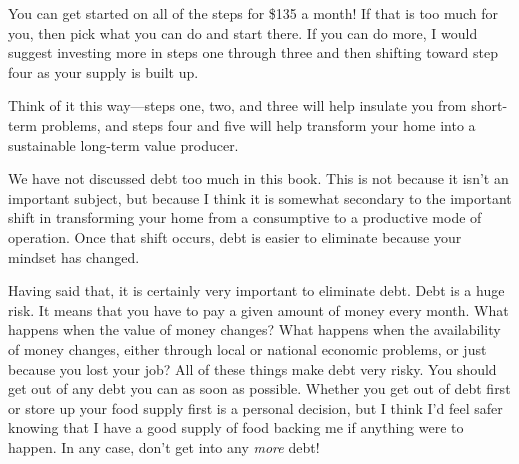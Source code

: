 You can get started on all of the steps for \$135 a
month! If that is too
much for you, then pick what you can do and start there. If you can do
more, I would suggest investing more in steps one through three and
then shifting toward step four as your supply is built up.

Think of it this way—steps one, two, and three will help insulate you
from short-term problems, and steps four and five will help transform
your home into a sustainable long-term value producer.

\begin{infonote}

We have not discussed debt too much in this book. This is not because it
isn't an important subject, but because I think it is
somewhat secondary to the important shift in transforming your home
from a consumptive to a productive mode of operation. Once that shift
occurs, debt is easier to eliminate because your mindset has changed. 

Having said that, it is certainly very important to eliminate debt. Debt
is a huge risk. It means that you have to pay a given amount of money
every month. What happens when the value of money changes?  What
happens when the availability of money changes, either through local or
national economic problems, or just because you lost your job?  All of
these things make debt very risky. You should get out of any debt you
can as soon as possible. Whether you get out of debt first or store up
your food supply first is a personal decision, but I think
I'd feel safer knowing that I have a good supply of
food backing me if anything were to happen. In any case,
don't get into any \textit{more} debt!

\end{infonote}

